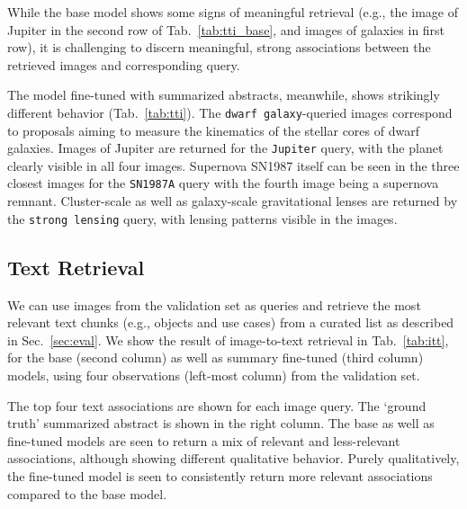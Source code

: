 \documentclass[10pt]{article} %
\begin{document}
While the base model shows some signs of meaningful retrieval (e.g., the image of Jupiter in the second row of Tab.~\ref{tab:tti_base}, and images of galaxies in first row), it is challenging to discern meaningful, strong associations between the retrieved images and corresponding query.

The model fine-tuned with summarized abstracts, meanwhile, shows strikingly different behavior (Tab.~\ref{tab:tti}).
%
%
The \texttt{dwarf galaxy}-queried images correspond to proposals aiming to measure the kinematics of the stellar cores of dwarf galaxies.
%
Images of Jupiter are returned for the \texttt{Jupiter} query, with the planet clearly visible in all four images.
%
Supernova SN1987 itself can be seen in the three closest images for the \texttt{SN1987A} query with the fourth image being a supernova remnant.
%
Cluster-scale as well as galaxy-scale gravitational lenses are returned by the \texttt{strong lensing} query, with lensing patterns visible in the images.

\subsection{Text Retrieval}

We can use images from the validation set as queries and retrieve the most relevant text chunks (e.g., objects and use cases) from a curated list as described in Sec.~\ref{sec:eval}.
%
We show the result of image-to-text retrieval in Tab.~\ref{tab:itt}, for the base (second column) as well as summary fine-tuned (third column) models, using four observations (left-most column) from the validation set.

The top four text associations are shown for each image query.
%
The `ground truth' summarized abstract is shown in the right column.
% 
The base as well as fine-tuned models are seen to return a mix of relevant and less-relevant associations, although showing different qualitative behavior. Purely qualitatively, the fine-tuned model is seen to consistently return more relevant associations compared to the base model.
%
\end{document}
